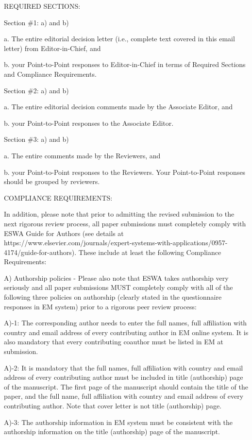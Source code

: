 \documentclass[12pt, review]{elsarticle}
\newcounter{reviewer}
\begin{document}
REQUIRED SECTIONS: 

Section \#1: a) and b)

a.  The entire editorial decision letter (i.e., complete text covered in this email letter) from Editor-in-Chief, and 

b.  your Point-to-Point responses to Editor-in-Chief in terms of Required Sections and Compliance Requirements.  

Section \#2: a) and b)

a.  The entire editorial decision comments made by the Associate Editor, and 

b.  your Point-to-Point responses to the Associate Editor.  

Section \#3: a) and b)

a.  The entire comments made by the Reviewers, and 

b.  your Point-to-Point responses to the Reviewers. Your Point-to-Point responses should be grouped by reviewers.  

COMPLIANCE REQUIREMENTS: 

In addition, please note that prior to admitting the revised submission to the next rigorous review process, all paper submissions must completely comply with ESWA Guide for Authors (see details at {https://www.elsevier.com/journals/expert-systems-with-applications/0957-4174/guide-for-authors}).  These include at least the following Compliance Requirements:

A) Authorship policies - Please also note that ESWA takes authorship very seriously and all paper submissions MUST completely comply with all of the following three policies on authorship (clearly stated in the questionnaire responses in EM system) prior to a rigorous peer review process:

A)-1: The corresponding author needs to enter the full names, full affiliation with country and email address of every contributing author in EM online system.  It is also mandatory that every contributing coauthor must be listed in EM at submission.

A)-2: It is mandatory that the full names, full affiliation with country and email address of every contributing author must be included in title (authorship) page of the manuscript. The first page of the manuscript should contain the title of the paper, and the full name, full affiliation with country and email address of every contributing author. Note that cover letter is not title (authorship) page.  

A)-3: The authorship information in EM system must be consistent with the authorship information on the title (authorship) page of the manuscript.
\end{document}
